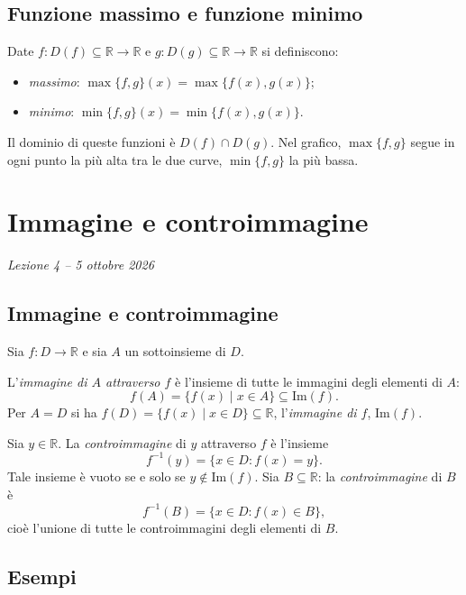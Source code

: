 \documentclass[11pt,a4paper]{article}
\begin{document}
\subsection{Funzione massimo e funzione minimo}

Date $f : D(f) \subseteq \mathbb{R} \to \mathbb{R}$ e $g : D(g) \subseteq \mathbb{R} \to \mathbb{R}$ si definiscono:
\begin{itemize}
    \item \emph{massimo}: $\max\{f, g\}(x) = \max\{f(x), g(x)\}$;
    \item \emph{minimo}: $\min\{f, g\}(x) = \min\{f(x), g(x)\}$.
\end{itemize}
Il dominio di queste funzioni è $D(f) \cap D(g)$. Nel grafico, $\max\{f, g\}$ segue in ogni punto la più alta tra le due curve, $\min\{f, g\}$ la più bassa.

\section[Immagine e controimmagine (Lezione 4 -- 5 ottobre 2026)]{Immagine e controimmagine}
\noindent\emph{Lezione 4 -- 5 ottobre 2026}
\subsection{Immagine e controimmagine}

Sia $f : D \to \mathbb{R}$ e sia $A$ un sottoinsieme di $D$.

\begin{definizione}
L'\emph{immagine di $A$ attraverso $f$} è l'insieme di tutte le immagini degli elementi di $A$:
\[
f(A) = \{f(x) \mid x \in A\} \subseteq \mathrm{Im}(f).
\]
Per $A = D$ si ha $f(D) = \{f(x) \mid x \in D\} \subseteq \mathbb{R}$, l'\emph{immagine di $f$}, $\mathrm{Im}(f)$.
\end{definizione}

\begin{definizione}
Sia $y \in \mathbb{R}$. La \emph{controimmagine} di $y$ attraverso $f$ è l'insieme
\[
f^{-1}(y) = \{x \in D : f(x) = y\}.
\]
Tale insieme è vuoto se e solo se $y \notin \mathrm{Im}(f)$. Sia $B \subseteq \mathbb{R}$: la \emph{controimmagine} di $B$ è
\[
f^{-1}(B) = \{x \in D : f(x) \in B\},
\]
cioè l'unione di tutte le controimmagini degli elementi di $B$.
\end{definizione}

\subsection{Esempi}
\end{document}
